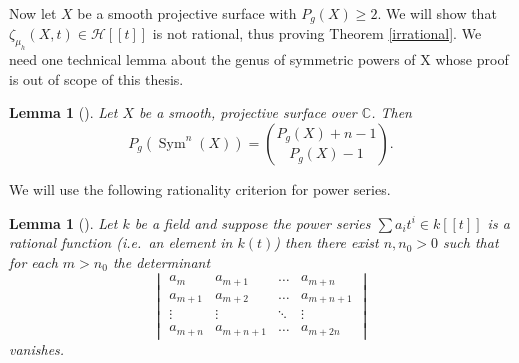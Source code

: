 \documentclass[11pt, a4paper, german]{article}
\theoremstyle{plain}
\newtheorem{lemma}[theorem]{Lemma}
\theoremstyle{definition}
\DeclareMathOperator{\Sym}{Sym}
\begin{document}
Now let $X$ be a smooth projective surface with $P_g(X) \geq 2$. We will show that $\zeta_{\mu_h}(X,t) \in \mathcal{H}[[t]]$ is not rational,
thus proving Theorem \ref{irrational}. We need one technical lemma about the genus of symmetric powers of X whose proof is out of scope of this
thesis.

\begin{lemma}[{\cite[Lem. 3.8]{MR1996804}}]
    \label{genus}
    Let $X$ be a smooth, projective surface over $\mathbb{C}$. Then
    \[
        P_g(\Sym^n(X)) = \binom{P_g(X) + n - 1}{P_g(X) - 1}.
    \]
\end{lemma}

We will use the following rationality criterion for power series.

\begin{lemma}[{\cite[Lem. 3.1]{bruhat}}]
    Let $k$ be a field and suppose the power series $\sum a_it^i \in k[[t]]$  is a rational function (i.e.\ an element in $k(t)$) then
    there exist $n, n_0 > 0$ such that for each $m > n_0$ the determinant
    \[
        \begin{vmatrix}
            a_m     & a_{m+1} & \dots & a_{m+n} \\
            a_{m+1} & a_{m+2} & \dots & a_{m+n+1} \\
            \vdots  & \vdots  & \ddots & \vdots \\
            a_{m+n} & a_{m+n+1} & \dots & a_{m+2n}
        \end{vmatrix}
    \]
    vanishes.
\end{lemma}
\end{document}

